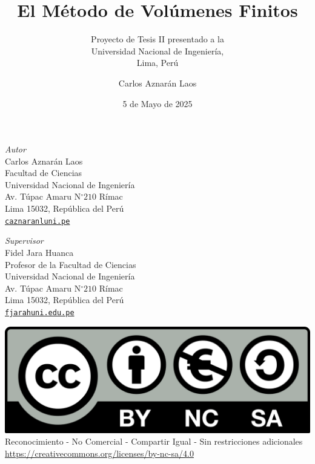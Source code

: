 \documentclass[graybox,envcountchap,sectrefs,a4paper]{svmono}
\date{5 de Mayo de 2025}
\makeatletter
\newcommand{\MVAt}{{\usefont{U}{mvs}{m}{n}\symbol{`@}}}
\makeatother
\begin{document}
\author{Carlos Aznarán Laos}
\title{El Método de Volúmenes Finitos}
\subtitle{Proyecto de Tesis II presentado a la \\
    Universidad Nacional de Ingeniería, \\
    Lima, Perú}
\maketitle

\clearpage
\thispagestyle{empty}

\begin{minipage}[t]{0.5\textwidth}
    \textit{Autor} \\
    Carlos Aznarán Laos~\href{https://orcid.org/0000-0001-8314-2271}{\textcolor{orcidcolor}{\aiOrcid}} \\
    Facultad de Ciencias \\
    Universidad Nacional de Ingeniería \\
    Av. Túpac Amaru N$^{\circ}210$ Rímac \\
    Lima 15032, República del Perú \\
    \textcolor{black}{}
    \href{mailto:caznaranl@uni.pe}{\texttt{caznaranl\MVAt uni.pe}}
\end{minipage}\hfill
\begin{minipage}[t]{0.5\textwidth}
    \textit{Supervisor} \\
    Fidel Jara Huanca~\href{https://orcid.org/0009-0000-1884-1949}{\textcolor{orcidcolor}{\aiOrcid}} \\
    Profesor de la Facultad de Ciencias \\
    Universidad Nacional de Ingeniería \\
    Av. Túpac Amaru N$^{\circ}210$ Rímac \\
    Lima 15032, República del Perú \\
    \textcolor{black}{}
    \href{mailto:fjarah@uni.edu.pe}{\texttt{fjarah\MVAt uni.edu.pe}}
\end{minipage}

\vfill



\noindent
\includegraphics[width=.25\textwidth]{CC-BY-NC-SA-4.0} \\
Reconocimiento - No Comercial - Compartir Igual - Sin restricciones adicionales \\
\url{https://creativecommons.org/licenses/by-nc-sa/4.0} \\
\end{document}
